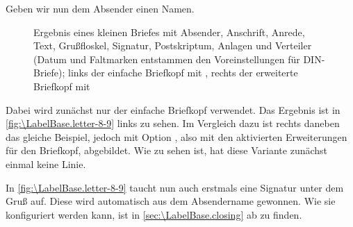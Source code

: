 \begin{Example}
  Geben wir nun dem Absender 
  \iffalse %
  aus den bisherigen Beispielen 
  \fi %
  einen Namen.
  \begin{figure}
    \centering
    \quad
    \caption[{Beispiel: Brief mit Absender, Anschrift, Anrede,
      Text, Grußfloskel, Signatur, Postskriptum, Anlagen und Verteiler}]
    {Ergebnis eines kleinen Briefes mit Absender, Anschrift, Anrede, Text,
      Grußfloskel, Signatur, Postskriptum, Anlagen und Verteiler (Datum und
      Faltmarken entstammen den Voreinstellungen für DIN-Briefe); links der
      einfache Briefkopf mit ,
      rechts der
      erweiterte Briefkopf mit }
    \label{fig:\LabelBase.letter-8-9}
  \end{figure}
  Dabei wird zunächst %
  \iffalse %
  einmal nicht der erweiterte Briefkopf, sondern %
  \fi %
  nur der einfache Briefkopf verwendet. Das Ergebnis ist in
  \autoref{fig:\LabelBase.letter-8-9} links zu sehen.  Im Vergleich dazu ist
  rechts daneben das gleiche Beispiel, jedoch mit Option
  , also mit den aktivierten
  Erweiterungen für den Briefkopf, abgebildet. Wie zu sehen ist, hat diese
  Variante zunächst einmal keine Linie.

  In \autoref{fig:\LabelBase.letter-8-9} taucht nun auch erstmals eine Signatur
  unter dem Gruß auf. Diese wird automatisch aus dem Absendername
  gewonnen. Wie sie konfiguriert werden kann, ist in
  \autoref{sec:\LabelBase.closing} ab  zu
  finden.


\end{Example}
